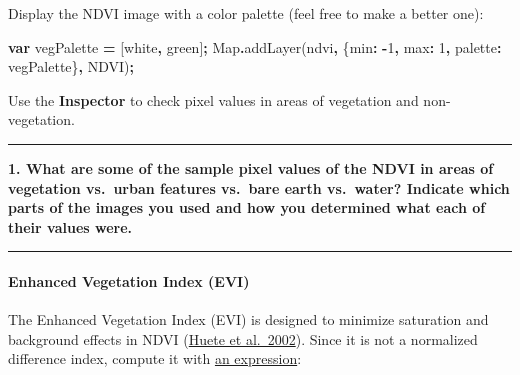 \documentclass[
]{article}
\newenvironment{Shaded}{\begin{snugshade}}{\end{snugshade}}
\newcommand{\BuiltInTok}[1]{#1}
\newcommand{\DataTypeTok}[1]{\textcolor[rgb]{0.13,0.29,0.53}{#1}}
\newcommand{\DecValTok}[1]{\textcolor[rgb]{0.00,0.00,0.81}{#1}}
\newcommand{\FunctionTok}[1]{\textcolor[rgb]{0.00,0.00,0.00}{#1}}
\newcommand{\KeywordTok}[1]{\textcolor[rgb]{0.13,0.29,0.53}{\textbf{#1}}}
\newcommand{\NormalTok}[1]{#1}
\newcommand{\OperatorTok}[1]{\textcolor[rgb]{0.81,0.36,0.00}{\textbf{#1}}}
\newcommand{\StringTok}[1]{\textcolor[rgb]{0.31,0.60,0.02}{#1}}
\begin{document}
Display the NDVI image with a color palette (feel free to make a better one):

\begin{Shaded}
\begin{Highlighting}[]
\KeywordTok{var}\NormalTok{  vegPalette }\OperatorTok{=}\NormalTok{ [}\StringTok{\textquotesingle{}white\textquotesingle{}}\OperatorTok{,} \StringTok{\textquotesingle{}green\textquotesingle{}}\NormalTok{]}\OperatorTok{;}   
\BuiltInTok{Map}\OperatorTok{.}\FunctionTok{addLayer}\NormalTok{(ndvi}\OperatorTok{,}\NormalTok{ \{}\DataTypeTok{min}\OperatorTok{:} \OperatorTok{{-}}\DecValTok{1}\OperatorTok{,} \DataTypeTok{max}\OperatorTok{:} \DecValTok{1}\OperatorTok{,}  
                    \DataTypeTok{palette}\OperatorTok{:}\NormalTok{ vegPalette\}}\OperatorTok{,} \StringTok{\textquotesingle{}NDVI\textquotesingle{}}\NormalTok{)}\OperatorTok{;}  
\end{Highlighting}
\end{Shaded}

Use the \textbf{Inspector} to check pixel values in areas of vegetation and non-vegetation.

\begin{center}\rule{0.5\linewidth}{0.5pt}\end{center}

\textbf{1. What are some of the sample pixel values of the NDVI in areas of vegetation vs.~urban features vs.~bare earth vs.~water? Indicate which parts of the images you used and how you determined what each of their values were.}

\begin{center}\rule{0.5\linewidth}{0.5pt}\end{center}

\hypertarget{enhanced-vegetation-index-evi}{%
\paragraph{Enhanced Vegetation Index (EVI)}\label{enhanced-vegetation-index-evi}}

The Enhanced Vegetation Index (EVI) is designed to minimize saturation and background effects in NDVI (\href{http://www.sciencedirect.com/science/article/pii/S0034425702000962}{Huete et al.~2002}). Since it is not a normalized difference index, compute it with \href{https://developers.google.com/earth-engine/image_math\#expressions}{an expression}:
\end{document}
